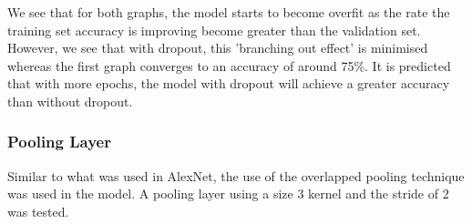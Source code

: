 \documentclass[../main.tex]{subfiles}
\begin{document}
We see that for both graphs, the model starts to become overfit as the rate the training set accuracy is improving become greater than the validation set. However, we see that with dropout, this 'branching out effect' is minimised whereas the first graph converges to an accuracy of around 75\%. It is predicted that with more epochs, the model with dropout will achieve a greater accuracy than without dropout.

\subsubsection{Pooling Layer}

Similar to what was used in AlexNet, the use of the overlapped pooling technique was used in the model. A pooling layer using a size 3 kernel and the stride of 2 was tested.
\end{document}
